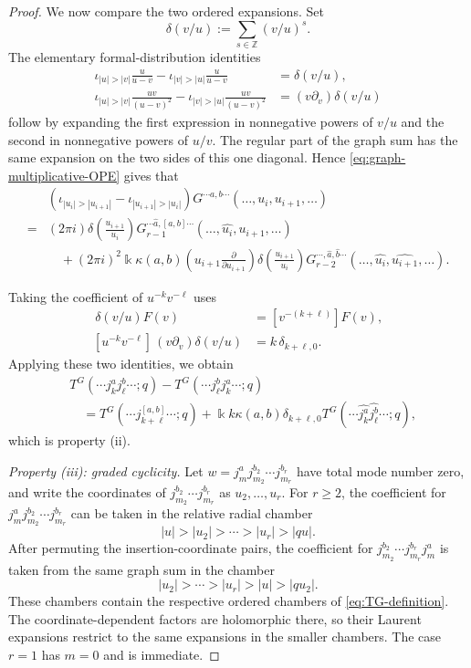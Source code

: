 \documentclass[11pt,a4paper]{amsart}
\numberwithin{equation}{section}
\theoremstyle{definition}
\theoremstyle{remark}
\newcommand{\ZZ}{\mathbb Z}
\newcommand{\kk}{\Bbbk}
\newcommand{\ii}{i}
\begin{document}
\begin{proof}
We now compare the two ordered expansions. Set
\begin{equation*}
 \delta(v/u):=\sum_{s\in\ZZ}(v/u)^s.
\end{equation*}
The elementary formal-distribution identities
\begin{align*}
 \iota_{|u|>|v|}\frac{u}{u-v}
 -\iota_{|v|>|u|}\frac{u}{u-v}
 &=\delta(v/u),\\
 \iota_{|u|>|v|}\frac{uv}{(u-v)^2}
 -\iota_{|v|>|u|}\frac{uv}{(u-v)^2}
 &=(v\partial_v)\delta(v/u)
\end{align*}
follow by expanding the first expression in nonnegative powers of $v/u$
and the second in nonnegative powers of $u/v$.  The regular part of the graph sum has the same expansion on
the two sides of this one diagonal.  Hence \eqref{eq:graph-multiplicative-OPE} gives that
\begin{align*}
& \left(\iota_{|u_i|>|u_{i+1}|}-\iota_{|u_{i+1}|>|u_{i}|}\right)G^{\cdots a,b\cdots}(\ldots, u_i,u_{i+1},\ldots) \\
= & (2\pi\ii)\delta \left(\frac{u_{i+1}}{u_i}\right)G^{\cdots \widehat{a},[a,b]\cdots}_{r-1}(\ldots,\widehat{u_i},u_{i+1},\ldots)
\\ &\quad+(2\pi\ii)^2\kk\kappa(a,b) \left( u_{i+1}\frac{\partial}{\partial u_{i+1}}\right)\delta\left(\frac{u_{i+1}}{u_i}\right)G^{\cdots,\widehat{a},\widehat{b}\cdots}_{r-2}(\ldots,\widehat{u_i},\widehat{u_{i+1}},\ldots).
\end{align*}

Taking the coefficient of $u^{-k}v^{-\ell}$ uses
\begin{align*}
 [u^{-k}v^{-\ell}]\,\delta(v/u)F(v)
 &=[v^{-(k+\ell)}]F(v),\\
 [u^{-k}v^{-\ell}]\,(v\partial_v)\delta(v/u)
 &=k\,\delta_{k+\ell,0}.
\end{align*}
Applying these two identities, we obtain
\begin{align*}
 &T^G(\cdots j_k^a j_\ell^b\cdots;q)
 -T^G(\cdots j_\ell^b j_k^a\cdots;q)\\
 &\quad=T^G(\cdots j_{k+\ell}^{[a,b]}\cdots;q)
 +\kk k\kappa(a,b)\delta_{k+\ell,0}
 T^G(\cdots\widehat{j_k^a}\widehat{j_\ell^b}\cdots;q),
\end{align*}
which is property (ii).

\smallskip
\noindent\emph{Property (iii): graded cyclicity.}
Let $w=j_m^a j_{m_2}^{b_2}\cdots j_{m_r}^{b_r}$ have total mode number zero, and write the coordinates of $j_{m_2}^{b_2}\cdots j_{m_r}^{b_r}$ as $u_2,\ldots,u_r$. 
For $r\geq 2$, the coefficient for $j_m^a j_{m_2}^{b_2}\cdots j_{m_r}^{b_r}$ can be taken in the relative radial chamber
\[
 |u|>|u_2|>\cdots>|u_r|>|qu|.
\]
After permuting the insertion-coordinate pairs, the coefficient for $j_{m_2}^{b_2}\cdots j_{m_r}^{b_r}j_m^a$ is taken from the same graph sum in the chamber
\[
 |u_2|>\cdots>|u_r|>|u|>|qu_2|.
\]
These chambers contain the respective ordered chambers of \eqref{eq:TG-definition}. The coordinate-dependent factors are holomorphic there, so their Laurent expansions restrict to the same expansions in the smaller chambers. The case $r=1$ has $m=0$ and is immediate.


\end{proof}
\end{document}
